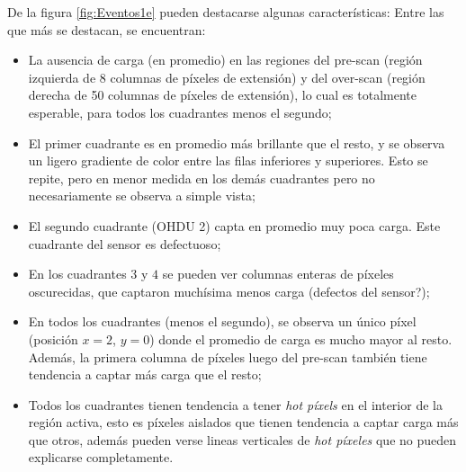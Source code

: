 \indent De la figura \ref{fig:Eventos1e} pueden destacarse algunas características: Entre las que más se destacan, se encuentran:
\begin{itemize}
    \item La ausencia de carga (en promedio) en las regiones del pre-scan (región izquierda de 8 columnas de píxeles de extensión) y del over-scan (región derecha de 50 columnas de píxeles de extensión), lo cual es totalmente esperable, para todos los cuadrantes menos el segundo;
    \item El primer cuadrante es en promedio más brillante que el resto, y se observa un ligero gradiente de color entre las filas inferiores y superiores. Esto se repite, pero en menor medida en los demás cuadrantes pero no necesariamente se observa a simple vista;
    \item El segundo cuadrante (OHDU 2) capta en promedio muy poca carga. Este cuadrante del sensor es defectuoso;
    \item En los cuadrantes $3$ y $4$ se pueden ver columnas enteras de píxeles oscurecidas, que captaron muchísima menos carga (defectos del sensor?);
    \item En todos los cuadrantes (menos el segundo), se observa un único píxel (posición $x = 2$, $y = 0$) donde el promedio de carga es mucho mayor al resto. Además, la primera columna de píxeles luego del pre-scan también tiene tendencia a captar más carga que el resto;
    \item Todos los cuadrantes tienen tendencia a tener \textit{hot píxels} en el interior de la región activa, esto es píxeles aislados que tienen tendencia a captar carga más que otros, además pueden verse lineas verticales de \textit{hot píxeles} que no pueden explicarse completamente.
\end{itemize}

